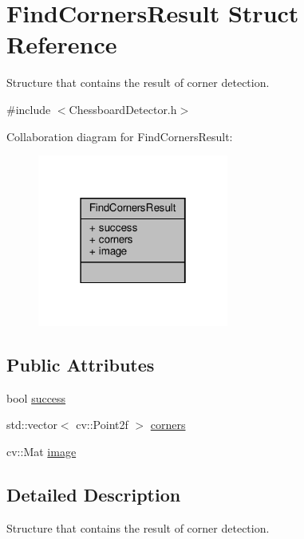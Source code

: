 \hypertarget{struct_find_corners_result}{}\section{Find\+Corners\+Result Struct Reference}
\label{struct_find_corners_result}


Structure that contains the result of corner detection.  




{\ttfamily \#include $<$Chessboard\+Detector.\+h$>$}



Collaboration diagram for Find\+Corners\+Result\+:\nopagebreak
\begin{figure}[H]
\begin{center}
\leavevmode
\includegraphics[width=178pt]{struct_find_corners_result__coll__graph}
\end{center}
\end{figure}
\subsection*{Public Attributes}
\begin{DoxyCompactItemize}
\item 
bool \hyperlink{struct_find_corners_result_a53a6b5d4fc0243582800d92b2bc5e706}{success}
\item 
std\+::vector$<$ cv\+::\+Point2f $>$ \hyperlink{struct_find_corners_result_a138337b67fb9eb6010ec7c9a276a009f}{corners}
\item 
cv\+::\+Mat \hyperlink{struct_find_corners_result_a8c2fd90c9f86bed108eb777fd237f113}{image}
\end{DoxyCompactItemize}


\subsection{Detailed Description}
Structure that contains the result of corner detection. 

